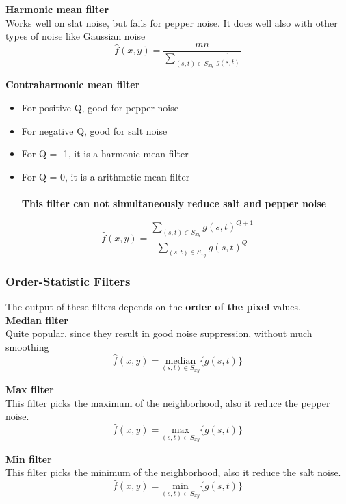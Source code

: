 \textbf{Harmonic mean filter}\\
Works well on slat noise, but fails for pepper noise. It does well also with other types of noise like Gaussian noise
\begin{equation}
	\hat{f}(x,y)= \frac{mn}{\sum\limits_{(s,t)\in S_{xy}} \frac{1}{g(s,t)}}
\end{equation}

\textbf{Contraharmonic mean filter}
\begin{itemize}
\item For positive Q, good for pepper noise
\item For negative Q, good for salt noise
\item For Q = -1, it is a harmonic mean filter
\item For Q = 0, it is a arithmetic mean filter\\ \\
\textbf{This filter can not simultaneously reduce salt and pepper noise}
\end{itemize}

\begin{equation}
	\hat{f}(x,y)= \frac{\sum\limits_{(s,t)\in S_{xy}} g(s,t)^{Q+1}}{\sum\limits_{(s,t)\in S_{xy}} g(s,t)^Q}
\end{equation}

\subsubsection{Order-Statistic Filters }

The output of these filters depends on the \textbf{order of the pixel} values. \\

\textbf{Median filter}\\
Quite popular, since they result in good noise suppression, without much smoothing \\
\begin{equation}
	\hat{f}(x,y)=\underset{(s,t) \in S_{xy}}{\text{median}}\{g(s,t) \}
\end{equation}

\textbf{Max filter}\\
This filter picks the maximum of the neighborhood, also it reduce the pepper noise.
\begin{equation}
	\hat{f}(x,y)=\underset{(s,t) \in S_{xy}}{\text{max}}\{g(s,t) \}
\end{equation}

\textbf{Min filter}\\
This filter picks the minimum of the neighborhood, also it reduce the salt noise.
\begin{equation}
	\hat{f}(x,y)=\underset{(s,t) \in S_{xy}}{\text{min}}\{g(s,t) \}
\end{equation}

